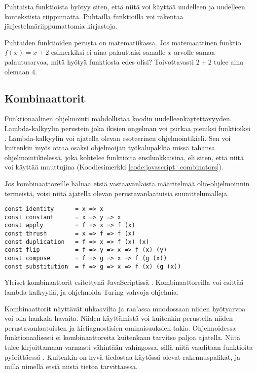 Puhtaista funktioista hyötyy siten, että niitä voi käyttää uudelleen ja uudelleen kontekstista riippumatta. Puhtailla funktioilla voi rakentaa järjestelmäriippumattomia kirjastoja.

Puhtaiden funktioiden perusta on matematiikassa. Jos matemaattinen funktio $f(x) = x+2$ esimerkiksi ei aina palauttaisi samalle $x$ arvolle samaa palautusarvoa, mitä hyötyä funktiosta edes olisi? Toivottavasti $2 + 2$ tulee aina olemaan $4$.

\subsection{Kombinaattorit}

Funktionaalinen ohjelmointi mahdollistaa koodin uudelleenkäytettävyyden. Lambda-kalkyylin perustein joka ikisien ongelman voi purkaa pieniksi funktioiksi \cite{BlellochHarper2015}. Lambda-kalkyylin voi ajatella olevan esoteerinen ohjelmointikieli. Sen voi kuitenkin myös ottaa osaksi ohjelmoijan työkalupakkia missä tahansa ohjelmointikielessä, joka kohtelee funktioita ensiluokkaisina, eli siten, että niitä voi käyttää muuttujina (Koodiesimerkki \ref{code:javascript_combinators}).

Jos kombinaattoreille haluaa etsiä vastaavanlaista määritelmää olio-ohjelmoinnin termeistä, voisi niitä ajatella olevan perustavanlaatuisia suunittelumalleja.

\begin{code}
    \begin{verbatim}
const identity      = x => x
const constant      = x => y => x
const apply         = f => x => f (x)
const thrush        = x => f => f (x)
const duplication   = f => x => f (x) (x)
const flip          = f => y => x => f (x) (y)
const compose       = f => g => x => f (g (x)) 
const substitution  = f => g => x => f (x) (g (x))
\end{verbatim}
    \caption{Yleiset kombinaattorit esitettynä JavaScriptissä \cite{javascript_combinators}. Kombinaattoreilla voi esittää lambda-kalkyyliä, ja ohjelmoida Turing-vahvoja ohjelmia.}
    \label{code:javascript_combinators}
\end{code}

Kombinaattorit näyttävät uhkaavilta ja raa'assa muodossaan niiden hyötyarvoa voi olla hankala havaita. Niiden käyttämistä voi kuitenkin perustella niiden perustavanlaatuisten ja kieliagnostisien ominaisuuksien takia. Ohjelmoidessa funktionaalisesti ei kombinaattoreita kuitenkaan tarvitse paljoa ajatella. Niitä tulee kirjoittamaan varmasti vähintään vahingossa, sillä niitä vaaditaan funktioita pyörittäessä \cite{javascript_combinators}. Kuitenkin on hyvä tiedostaa käytössä olevat rakennuspalikat, ja millä nimellä etsiä niistä tietoa tarvittaessa.

